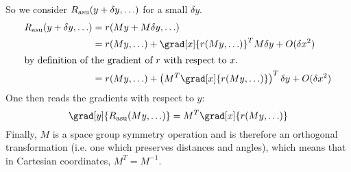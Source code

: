 \documentclass[11pt]{article}
\begin{document}
So we consider $R_{\text{asu}}(y+\delta y, \ldots)$ for a small $\delta y$.
\begin{align}
\rasu(y+\delta y, \ldots) &= r(My + M\delta y, \ldots)\nonumber\\
& = r(My, \ldots) + \grad[x]{r(My, \ldots)}^T M\delta y +  O(\delta x^2)\nonumber\\
\intertext{by definition of the gradient of $r$ with respect to $x$.}
&= r(My, \ldots) + \left(M^T \grad[x]{r(My, \ldots)}\right)^T \delta y
 +  O(\delta x^2)\nonumber
\end{align}
One then reads the gradients with respect to $y$:
\begin{equation}
\grad[y]{\rasu(My, \ldots)} = M^T \grad[x]{r(My, \ldots)}
\end{equation}
Finally, $M$ is a space group symmetry operation and is therefore an
orthogonal transformation (i.e. one which preserves distances and angles),
which means that in Cartesian coordinates, $M^T = M^{-1}$.


\end{document}
